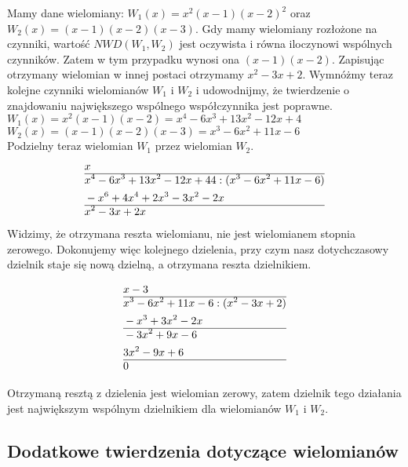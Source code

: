 \begin{example}
	$ $\\
	Mamy dane wielomiany: $W_1(x) = x^2(x-1)(x-2)^2$ oraz $W_2(x) = (x-1)(x-2)(x-3)$. Gdy mamy wielomiany rozłożone na czynniki, wartość $NWD(W_1, W_2)$ jest oczywista i równa iloczynowi wspólnych czynników. Zatem w tym przypadku wynosi ona $(x-1)(x-2)$. Zapisując otrzymany wielomian w innej postaci otrzymamy $x^2-3x+2$. Wymnóżmy teraz kolejne czynniki wielomianów $W_1$ i $W_2$ i udowodnijmy, że twierdzenie o znajdowaniu największego wspólnego współczynnika jest poprawne. \\
	$W_1(x) = x^2(x-1)(x-2) = x^4-6x^3+13x^2-12x+4$ \\
	$W_2(x) = (x-1)(x-2)(x-3) = x^3-6x^2+11x-6$ \\
	Podzielny teraz wielomian $W_1$ przez wielomian $W_2$.
	\begin{equation}
	\begin{split}
	&x\\\hline
	&x^4-6x^3+13x^2-12x+44 : (x^3-6x^2+11x-6) \\
	&-x^6+4x^4+2x^3-3x^2-2x \\\hline
	&x^2-3x+2x \\
	\end{split}
	\end{equation}
	Widzimy, że otrzymana reszta wielomianu, nie jest wielomianem stopnia zerowego. Dokonujemy więc kolejnego dzielenia, przy czym nasz dotychczasowy dzielnik staje się nową dzielną, a otrzymana reszta dzielnikiem.
	
	\begin{equation}
	\begin{split}
	&x-3\\\hline
	&x^3-6x^2+11x-6 : (x^2-3x+2) \\
	&-x^3+3x^2-2x \\\hline
	&-3x^2+9x-6 \\
	&3x^2-9x+6  \\\hline
	&0\\
	\end{split}
	\end{equation}
	
	Otrzymaną resztą z dzielenia jest wielomian zerowy, zatem dzielnik tego działania jest największym wspólnym dzielnikiem dla wielomianów $W_1$ i $W_2$.
\end{example}

\subsection{Dodatkowe twierdzenia dotyczące wielomianów}

